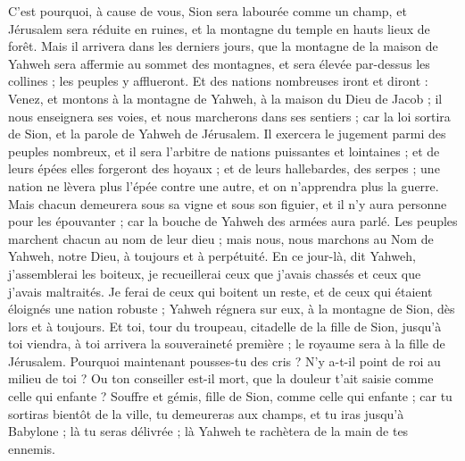 \begin{multicols}{2}
C'est pourquoi, à cause de vous, Sion sera labourée comme un champ, et Jérusalem sera réduite en ruines, et la montagne du temple en hauts lieux de forêt.
\VerseOne{}Mais il arrivera dans les derniers jours, que la montagne de la maison de Yahweh sera affermie au sommet des montagnes, et sera élevée par-dessus les collines ; les peuples y afflueront.
Et des nations nombreuses iront et diront : Venez, et montons à la montagne de Yahweh, à la maison du Dieu de Jacob ; il nous enseignera ses voies, et nous marcherons dans ses sentiers ; car la loi sortira de Sion, et la parole de Yahweh de Jérusalem.
Il exercera le jugement parmi des peuples nombreux, et il sera l'arbitre de nations puissantes et lointaines ; et de leurs épées elles forgeront des hoyaux ; et de leurs hallebardes, des serpes ; une nation ne lèvera plus l'épée contre une autre, et on n'apprendra plus la guerre.
Mais chacun demeurera sous sa vigne et sous son figuier, et il n'y aura personne pour les épouvanter ; car la bouche de Yahweh des armées aura parlé.
Les peuples marchent chacun au nom de leur dieu ; mais nous, nous marchons au Nom de Yahweh, notre Dieu, à toujours et à perpétuité.
En ce jour-là, dit Yahweh, j'assemblerai les boiteux, je recueillerai ceux que j'avais chassés et ceux que j'avais maltraités.
Je ferai de ceux qui boitent un reste, et de ceux qui étaient éloignés une nation robuste ; Yahweh régnera sur eux, à la montagne de Sion, dès lors et à toujours.
Et toi, tour du troupeau, citadelle de la fille de Sion, jusqu'à toi viendra, à toi arrivera la souveraineté première ; le royaume sera à la fille de Jérusalem.
Pourquoi maintenant pousses-tu des cris ? N'y a-t-il point de roi au milieu de toi ? Ou ton conseiller est-il mort, que la douleur t'ait saisie comme celle qui enfante ?
Souffre et gémis, fille de Sion, comme celle qui enfante ; car tu sortiras bientôt de la ville, tu demeureras aux champs, et tu iras jusqu'à Babylone ; là tu seras délivrée ; là Yahweh te rachètera de la main de tes ennemis.

\end{multicols}
